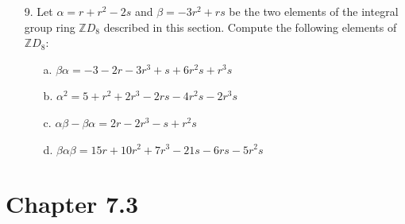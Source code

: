 \documentclass[10pt]{article}
\newcommand{\Z}{\mathbb{Z}}
\begin{document}
\begin{itemize}
\begin{proof}(Hazlett)
We claim that in the matrix $B = (b_{i,j}) = A^\ell$ we have $b_{i,j} = 0$, 
if $i < j + \ell - 1$.  We proceed by induction.  The case for $\ell=1$ is clear from the fact that $A$ is upper triangular.  Let $\ell=2$.  Hence, $B = A^2$.  Then $b_{i,j} = \sum_{k=1}^na_{i,k}a_{k,j}$.  Thus $b_{i,j} = 0$ for $i< k$ and $k < j$.  This implies $b_{i,j} = 0$ for $i < j+1 = j + \ell -1$.  So suppose that $B = A^\ell$ and $b_{i,j} = 0$ for $i < j+\ell - 1$.  Set $C = A^{\ell+1}$.  Thus $C = AA^{\ell} = AB$.  Then $c_{i,j} = \sum_{k=1}^na_{i,k}b_{k,j}$.  Hence $c_{i,j} = 0$ for $i < k$ and $k < j+\ell - 1$.  So $c_{i,j} = 0$ for $i < j + \ell = j + (\ell +1) - 1$, as desired.  Let $D = A^n$.  Then $d_{i,j} = 0$ for all $i < j + n - 1$.  Since $D$ is a $n\times n $ matrix we have $i < j + n - 1$ for all $i,j$.  Therefore $D = 0$.  
\end{proof}


\item[9.] Let $\alpha = r+r^2-2s$ and $\beta = -3r^2 + rs$ be the two elements of the integral group ring $\Z D_8$ described in this section.  Compute the following elements of $\Z D_8$:

\begin{itemize}

\item[a.] $\beta\alpha = -3 -2r - 3r^3+s+6r^2s +r^3s$

\item[b.] $\alpha^2 = 5+r^2+2r^3-2rs-4r^2s-2r^3s$

\item[c.] $\alpha\beta - \beta\alpha = 2r-2r^3-s+r^2s$

\item[d.] $\beta\alpha\beta = 15r+10r^2+7r^3-21s-6rs-5r^2s$

\end{itemize}

\end{itemize}

\section*{Chapter 7.3}
\end{document}
